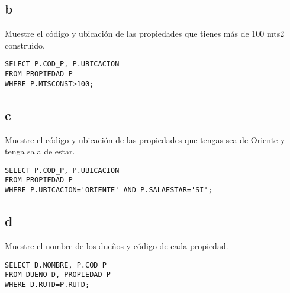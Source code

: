 \documentclass{templateNote}
\begin{document}
\subsection{b}
\indent
Muestre el código y ubicación de las propiedades que tienes más de 100 mts2 construido.
\begin{tcolorbox}
    [colback=gray!5!white,colframe=gray!75!black,fonttitle=\bfseries,title=SQL]
    \begin{sqlcode}
    \end{sqlcode}
    \begin{verbatim}
SELECT P.COD_P, P.UBICACION 
FROM PROPIEDAD P
WHERE P.MTSCONST>100;
    \end{verbatim}
\end{tcolorbox}

\subsection{c}
\indent
Muestre el código y ubicación de las propiedades que tengas sea de Oriente y tenga sala de estar.
\begin{tcolorbox}
    [colback=gray!5!white,colframe=gray!75!black,fonttitle=\bfseries,title=SQL]
    \begin{sqlcode}
    \end{sqlcode}
    \begin{verbatim}
SELECT P.COD_P, P.UBICACION
FROM PROPIEDAD P
WHERE P.UBICACION='ORIENTE' AND P.SALAESTAR='SI';
    \end{verbatim}
\end{tcolorbox}

\newpage

\subsection{d}
\indent
Muestre el nombre de los dueños y código de cada propiedad.
\begin{tcolorbox}
    [colback=gray!5!white,colframe=gray!75!black,fonttitle=\bfseries,title=SQL]
    \begin{sqlcode}
    \end{sqlcode}
    \begin{verbatim}
SELECT D.NOMBRE, P.COD_P
FROM DUENO D, PROPIEDAD P
WHERE D.RUTD=P.RUTD;
    \end{verbatim}
\end{tcolorbox}
\end{document}
